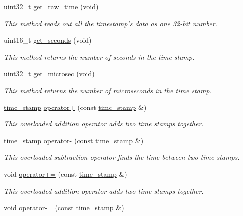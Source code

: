 \begin{DoxyCompactItemize}
uint32\-\_\-t \hyperlink{classtime__stamp_a0581d7cdbe3b58088b012101c5591f84}{get\-\_\-raw\-\_\-time} (void)
\begin{DoxyCompactList}\small\item\em This method reads out all the timestamp's data as one 32-\/bit number. \end{DoxyCompactList}\item 
uint16\-\_\-t \hyperlink{classtime__stamp_a63ab1f864af672570c9aaa1e9c9e2166}{get\-\_\-seconds} (void)
\begin{DoxyCompactList}\small\item\em This method returns the number of seconds in the time stamp. \end{DoxyCompactList}\item 
uint32\-\_\-t \hyperlink{classtime__stamp_af6253676e91ecd07308ae75dfca8edcf}{get\-\_\-microsec} (void)
\begin{DoxyCompactList}\small\item\em This method returns the number of microseconds in the time stamp. \end{DoxyCompactList}\item 
\hyperlink{classtime__stamp}{time\-\_\-stamp} \hyperlink{classtime__stamp_aa1a6629e252ce7ca5527b552a74d1639}{operator+} (const \hyperlink{classtime__stamp}{time\-\_\-stamp} \&)
\begin{DoxyCompactList}\small\item\em This overloaded addition operator adds two time stamps together. \end{DoxyCompactList}\item 
\hyperlink{classtime__stamp}{time\-\_\-stamp} \hyperlink{classtime__stamp_abeb2a4c4c54d3ad01a3672cc60bda2b2}{operator-\/} (const \hyperlink{classtime__stamp}{time\-\_\-stamp} \&)
\begin{DoxyCompactList}\small\item\em This overloaded subtraction operator finds the time between two time stamps. \end{DoxyCompactList}\item 
void \hyperlink{classtime__stamp_af5f4c6acb42cc7a1efabb83771562d3f}{operator+=} (const \hyperlink{classtime__stamp}{time\-\_\-stamp} \&)
\begin{DoxyCompactList}\small\item\em This overloaded addition operator adds two time stamps together. \end{DoxyCompactList}\item 
void \hyperlink{classtime__stamp_aec9c2ba7eac71c821af33a48a118b2db}{operator-\/=} (const \hyperlink{classtime__stamp}{time\-\_\-stamp} \&)

\end{DoxyCompactItemize}
